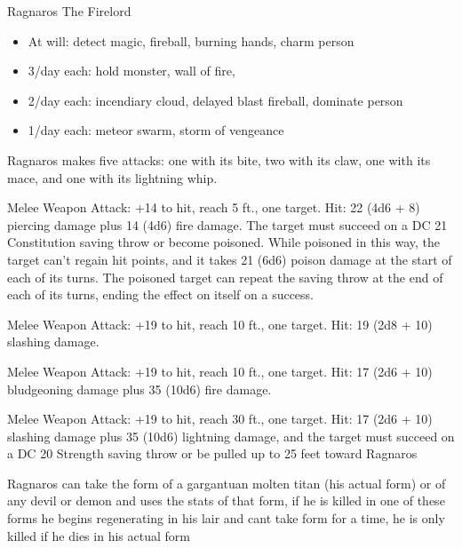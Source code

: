 \begin{monsterbox}{Ragnaros The Firelord}
\begin{monsteraction}
		\begin{itemize}
			\item At will: detect magic, fireball, burning hands, charm person
		
			\item 3/day each: hold monster, wall of fire, 
		
			\item 2/day each: incendiary cloud, delayed blast fireball, dominate person
		
			\item 1/day each: meteor swarm, storm of vengeance 
		\end{itemize}
	\end{monsteraction}	
	\begin{monsteraction}[Multiattack]
		Ragnaros makes five attacks: one with its bite, two with its claw, one with its mace, and one with its lightning whip.
	\end{monsteraction}	
	\begin{monsteraction}[Bite]
		Melee Weapon Attack: +14 to hit, reach 5 ft., one target. Hit: 22 (4d6 + 8) piercing damage plus 14 (4d6) fire damage.  The target must succeed on a DC 21 Constitution saving throw or become poisoned. While poisoned in this way, the target can't regain hit points, and it takes 21 (6d6) poison damage at the start of each of its turns. The poisoned target can repeat the saving throw at the end of each of its turns, ending the effect on itself on a success.
	\end{monsteraction}	
	\begin{monsteraction}[Claw]
		Melee Weapon Attack: +19 to hit, reach 10 ft., one target. Hit: 19 (2d8 + 10) slashing damage.
	\end{monsteraction}	
	\begin{monsteraction}[Mace]
		Melee Weapon Attack: +19 to hit, reach 10 ft., one target. Hit: 17 (2d6 + 10) bludgeoning damage plus 35 (10d6) fire damage.
	\end{monsteraction}	
	\begin{monsteraction}
		Melee Weapon Attack: +19 to hit, reach 30 ft., one target. Hit: 17 (2d6 + 10) slashing damage plus 35 (10d6) lightning damage, and the target must succeed on a DC 20 Strength saving throw or be pulled up to 25 feet toward Ragnaros
	\end{monsteraction}	
	\begin{monsteraction}[Polymorph]
		Ragnaros can take the form of a gargantuan molten titan (his actual form) or of any devil or demon and uses the stats of that form, if he is killed in one of these forms he begins regenerating in his lair and cant take form for a time, he is only killed if he dies in his actual form

\end{monsteraction}
\end{monsterbox}
